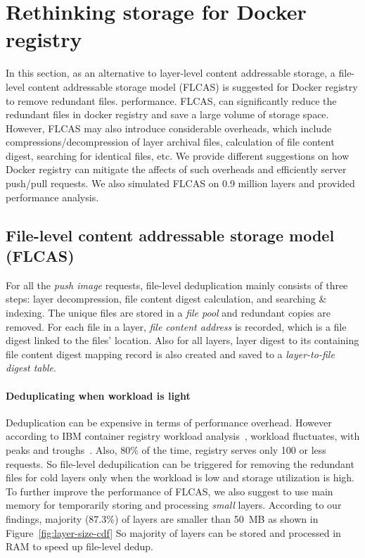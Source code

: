 \section{Rethinking storage for Docker registry}
\label{sec:file_adressable}
In this section, as an alternative to layer-level content addressable storage,
a file-level content addressable storage model (FLCAS) is suggested for Docker
registry to remove redundant files.%
performance. FLCAS, can significantly reduce the redundant files in docker
registry and save a large volume of storage space. However, FLCAS may also
introduce considerable overheads, which include compressions/decompression of
layer archival files, calculation of file content digest, searching for
identical files, etc. We provide different suggestions on how Docker registry
can mitigate the affects of such overheads and efficiently server push/pull
requests.  We also simulated FLCAS on 0.9 million layers and provided
performance analysis.

\subsection{File-level content addressable storage model (FLCAS)}
For all the \emph{push image} requests, file-level deduplication mainly
consists of three steps: layer decompression, file content digest calculation,
and searching \& indexing. The unique files are stored in a \textit{file pool}
and redundant copies are removed.  For each
file in a layer, \textit{file content address} is recorded, which is a file
digest linked to the files' location.  Also for all layers, layer digest to its
containing file content digest mapping record is also created and saved to a
\textit{layer-to-file digest table}.     

\paragraph{Deduplicating when workload is light}
Deduplication can be expensive in terms of performance overhead.  However
according to IBM container registry workload analysis~\cite{dockerworkload},
workload fluctuates, with peaks and troughs~\cite{dockerworkload}. Also, 80\%
of the time, registry serves only 100 or less requests. So file-level
dedupilication can be triggered for removing the redundant files for cold
layers only when the workload is low and storage utilization is high.  To
further improve the performance of FLCAS, we also suggest to use main memory
for temporarily storing and processing \textit{small} layers. According to our
findings, majority (87.3\%) of layers are smaller than 50~MB as shown in
Figure~\ref{fig:layer-size-cdf} So majority of layers can be stored and
processed in RAM to speed up file-level dedup. 


